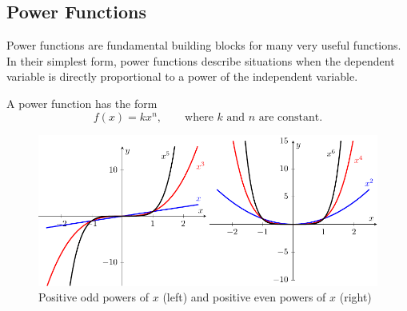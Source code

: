 

\subsection*{Power Functions}

Power functions are fundamental building blocks for many very useful functions.  In their simplest form, power functions describe situations when the dependent variable is directly proportional to a power of the independent variable.

\begin{definition}
A power function has the form
	\[ 
		f(x) = kx^{n}, \qquad \mbox{where } k \mbox{ and } n \mbox{ are constant.}
	\]
\end{definition}


\begin{figure}[ht!]
	\begin{center}
        \includegraphics[width=0.9\columnwidth]{figures/0-6-fig2.pdf}
	\end{center}     
\caption{Positive odd powers of $x$ (left) and positive even powers of $x$ (right)}     
\label{F:0.6.Ex1} 
\end{figure}

